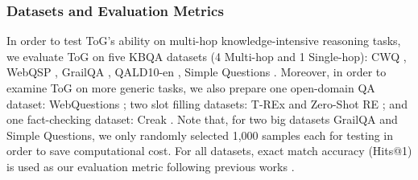 \documentclass{article} %
\begin{document}
\subsubsection{Datasets and Evaluation Metrics}
\label{sec: datasets}
In order to test ToG's ability on multi-hop knowledge-intensive reasoning tasks, we evaluate ToG on five KBQA datasets (4 Multi-hop and 1 Single-hop): CWQ \citep{cwq_dataset}, WebQSP \citep{webqsp_dataset}, GrailQA \citep{garilqa_dataset}, QALD10-en \citep{qald10-en_dataset}, Simple Questions \citep{simple_questions_dataset}. Moreover, in order to examine ToG on more generic tasks, we also prepare one open-domain QA dataset: WebQuestions \citep{webq_dataset}; two slot filling datasets: T-REx \citep{trex_dataset} and Zero-Shot RE \citep{kilt}; and one fact-checking dataset: Creak \citep{creak_dataset}. 
Note that, for two big datasets GrailQA and Simple Questions, we only randomly selected 1,000 samples each for testing in order to save computational cost. 
For all datasets, exact match accuracy (Hits@1) is used as our evaluation metric following previous works \citep{cok, knowledgeaugmented, structgpt, DB-BLINDER}.
\end{document}
